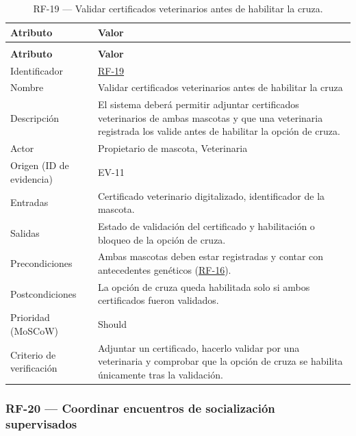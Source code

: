 \documentclass[journal,onecolumn]{IEEEtran}
\makeatletter
\newenvironment{atributos}[2]{%
	\small
	\begin{longtable}{@{}>{\raggedright\arraybackslash}p{4.2cm} >{\raggedright\arraybackslash}p{11.2cm}@{}}
		\caption{#2}\label{tab:#1}\\
		\toprule
		\textbf{Atributo} & \textbf{Valor} \\
		\midrule
		\endfirsthead
		\multicolumn{2}{@{}l}{\small\itshape (continuación)}\\
		\toprule
		\textbf{Atributo} & \textbf{Valor} \\
		\midrule
		\endhead
		\bottomrule
		\endlastfoot
	}{%
	\end{longtable}
	\normalsize
}
\makeatother
\begin{document}
	\begin{atributos}{RF-19}{RF-19 --- Validar certificados veterinarios antes de habilitar la cruza.}
		Identificador & \hyperref[tab:RF-19]{RF-19} \\
		Nombre & Validar certificados veterinarios antes de habilitar la cruza \\
		Descripción & El sistema deberá permitir adjuntar certificados veterinarios de ambas mascotas y que una veterinaria registrada los valide antes de habilitar la opción de cruza. \\
		Actor & Propietario de mascota, Veterinaria \\
		Origen (ID de evidencia) & EV-11 \\
		Entradas & Certificado veterinario digitalizado, identificador de la mascota. \\
		Salidas & Estado de validación del certificado y habilitación o bloqueo de la opción de cruza. \\
		Precondiciones & Ambas mascotas deben estar registradas y contar con antecedentes genéticos (\hyperref[tab:RF-16]{RF-16}). \\
		Postcondiciones & La opción de cruza queda habilitada solo si ambos certificados fueron validados. \\
		Prioridad (MoSCoW) & Should \\
		Criterio de verificación & Adjuntar un certificado, hacerlo validar por una veterinaria y comprobar que la opción de cruza se habilita únicamente tras la validación. \\
	\end{atributos}
	
	\subsubsection{RF-20 --- Coordinar encuentros de socialización supervisados}
	
\end{document}
